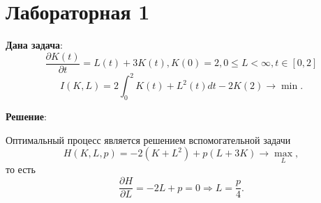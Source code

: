 \documentclass[a4paper, 12pt]{article}
\newcommand{\df}[2]{\frac{\partial #1}{\partial #2}}
\begin{document}
\section{Лабораторная 1}
{\bf Дана задача}:
\begin{equation}
    \dfrac{\partial K(t)}{\partial t}=L(t)+3K(t), K(0)=2,0\le L < \infty, t \in [0,2]
\end{equation}    
\begin{equation}
    I(K,L)=2\int_0^2 K(t)+L^2(t) dt - 2 K(2) \rightarrow \min.
\end{equation}

{\bf Решение}:

Оптимальный процесс является решением вспомогательной задачи
\begin{equation}
    H(K,L,p)=-2(K+L^2)+p(L+3K)\rightarrow \max_L,
\end{equation}
то есть 
\begin{equation}
   \df{H}{L}=-2L+p=0 \Rightarrow L=\frac{p}{4}.
\end{equation}
\end{document}
